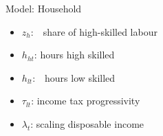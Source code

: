 \documentclass[11pt,aspectratio=169]{beamer}
\begin{document}
\begin{frame}{Model: Household}
\small
\vspace{4mm}
\begin{minipage}[t!]{0.4\textwidth}
	\vspace{7mm}
	\begin{itemize}
		\item[] $z_h$:\ \ share of high-skilled labour \vspace{-2mm}
		\item[] $h_{ht}$: hours high skilled\vspace{-2mm}
		\item[] $h_{lt}$:\ \ hours low skilled\vspace{-2mm}
	\end{itemize}
\end{minipage}
\begin{minipage}[t!]{0.4\textwidth}
	\vspace{8mm}
	\begin{itemize}
		\item[] $\tau_{lt}$: income tax progressivity
		\vspace{-2mm}	
		\item[] $\lambda_{t}$: scaling disposable income
	\end{itemize}
\end{minipage}
\end{frame}
\end{document}
